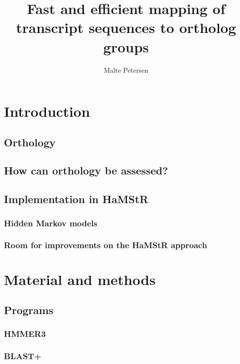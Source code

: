\documentclass[a4paper,13pt]{scrreprt}
\title{Fast and efficient mapping of transcript sequences to ortholog groups}
\author{Malte Petersen}
\newcommand{\hamstr}{HaMStR\xspace}
\begin{document}

\maketitle
\tableofcontents



\chapter{Introduction}
	
	\section{Orthology}
		
	\section{How can orthology be assessed?}
		
	\section{Implementation in \hamstr}
		
		\subsection{Hidden Markov models}
			
		\subsection{Room for improvements on the \hamstr approach}

\chapter{Material and methods}
	\section{Programs}
		
		\subsection{HMMER3}
			
		\subsection{BLAST+}
			
\end{document}
